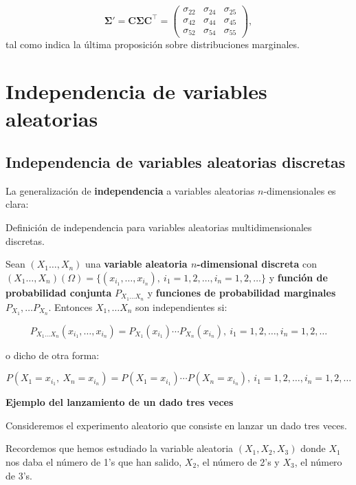 \documentclass[]{book}
\begin{document}
\[
\mathbf{\Sigma'}=\mathbf{C}\mathbf{\Sigma}\mathbf{C}^\top = \begin{pmatrix}\sigma_{22} & \sigma_{24} & \sigma_{25}\\ \sigma_{42} & \sigma_{44} & \sigma_{45} \\  \sigma_{52} & \sigma_{54} & \sigma_{55}\end{pmatrix}, 
\]
tal como indica la última proposición sobre distribuciones marginales.

\hypertarget{independencia-de-variables-aleatorias-1}{%
\section{Independencia de variables aleatorias}\label{independencia-de-variables-aleatorias-1}}

\hypertarget{independencia-de-variables-aleatorias-discretas-1}{%
\subsection{Independencia de variables aleatorias discretas}\label{independencia-de-variables-aleatorias-discretas-1}}

La generalización de \textbf{independencia} a variables aleatorias \(n\)-dimensionales es clara:

Definición de independencia para variables aleatorias multidimensionales discretas.

Sean \((X_1\ldots,X_n)\) una \textbf{variable aleatoria \(n\)-dimensional discreta} con \((X_1\ldots,X_n)(\Omega)=\{(x_{i_1},\ldots,x_{i_n}),\ i_1=1,2,\ldots,i_n=1,2,\ldots\}\) y \textbf{función de probabilidad conjunta} \(P_{X_1\ldots X_n}\) y \textbf{funciones de probabilidad marginales} \(P_{X_1},\ldots P_{X_n}\). Entonces \(X_1,\ldots X_n\) son independientes si:

\[
P_{X_1\ldots X_n}(x_{i_1},\ldots,x_{i_n})=P_{X_1}(x_{i_1})\cdots P_{X_n}(x_{i_n}),\ i_1=1,2,\ldots,i_n=1,2,\ldots
\]

o dicho de otra forma:

\[
P(X_1=x_{i_1},\ X_n=x_{i_n})=P(X_1=x_{i_1})\cdots P(X_n=x_{i_n}),\ i_1=1,2,\ldots,i_n=1,2,\ldots
\]

\textbf{Ejemplo del lanzamiento de un dado tres veces}

Consideremos el experimento aleatorio que consiste en lanzar un dado tres veces.

Recordemos que hemos estudiado la variable aleatoria \((X_1,X_2,X_3)\) donde \(X_1\) nos daba el número de 1's que han salido, \(X_2\), el número de 2's y \(X_3\), el número de 3's.
\end{document}

